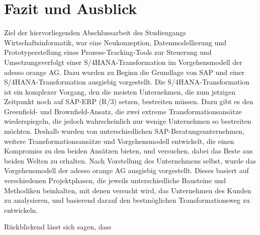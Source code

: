 \section{Fazit und Ausblick}
Ziel der hiervorliegenden Abschlussarbeit des Studiengangs Wirtschaftsinformatik, war eine Neukonzeption, Datenmodellierung und Prototyperstellung eines Prozess-Tracking-Tools zur Steuerung und Umsetzungsverfolgt einer S/4HANA-Transformation im Vorgehensmodell der adesso orange AG. Dazu wurden zu Beginn die Grundlage von SAP und einer S/4HANA-Transformation ausgiebig vorgestellt. Die S/4HANA-Transformation ist ein komplexer Vorgang, den die meisten Unternehmen, die zum jetzigen Zeitpunkt noch auf SAP-ERP (R/3) setzen, bestreiten müssen. Dazu gibt es den Greenfield- und Brownfield-Ansatz, die zwei extreme Transformationsansätze wiederspiegeln, die jedoch wahrscheinlich nur wenige Unternehmen so bestreiten möchten. Deshalb wurden von unterschiedlichen SAP-Beratungsunternehmen, weitere Transformationsansätze und Vorgehensmodell entwickelt, die einen Kompromiss zu den beiden Ansätzen bieten, und versuchen, dabei das Beste \glqq{}aus beiden Welten\grqq{} zu erhalten. Nach Vorstellung des Unternehmens selbst, wurde das Vorgehensmodell der adesso orange AG ausgiebig vorgestellt. Dieses basiert auf verschiedenen Projektphasen, die jeweils unterschiedliche Bausteine und Methodiken beinhalten, mit denen versucht wird, das Unternehmen des Kunden zu analysieren, und basierend darauf den bestmöglichen Transformationsweg zu entwickeln. 


Rückblickend  lässt sich sagen, dass 